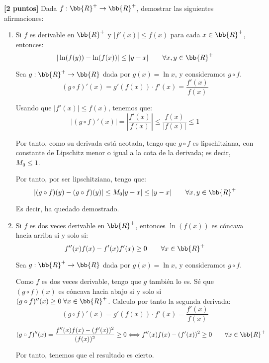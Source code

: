 \documentclass[12pt]{article}
\begin{document}
    \begin{ejercicio}\textbf{[2 puntos]}
Dada $f:\bb{R}^+ \to \bb{R}^+$, demostrar las siguientes afirmaciones:
\begin{enumerate}
    \item Si $f$ es derivable en $\bb{R}^+$ y $|f'(x)|\leq f(x)$ para cada $x\in \bb{R}^+$, entonces:
    \begin{equation*}
        |\ln (f(y)) -\ln(f(x))| \leq |y-x| \qquad \forall x,y\in \bb{R}^+
    \end{equation*}

    Sea $g:\bb{R}^+ \to \bb{R}$ dada por $g(x)=\ln x$, y consideramos $g\circ f$.
    \begin{equation*}
        (g\circ f)'(x) = g'(f(x))\cdot f'(x) = \frac{f'(x)}{f(x)} 
    \end{equation*}

    Usando que $|f'(x)|\leq f(x)$, tenemos que:
    \begin{equation*}
        \left|(g\circ f)'(x)\right| = \left|\frac{f'(x)}{f(x)}\right| \leq \frac{f(x)}{|f(x)|} \leq 1
    \end{equation*}

    Por tanto, como su derivada está acotada, tengo que $g\circ f$ es lipschitziana, con constante de Lipschitz menor o igual a la cota de la derivada; es decir, $M_0 \leq 1$.

    Por tanto, por ser lipschitziana, tengo que:
    \begin{equation*}
        |(g\circ f)(y)-(g\circ f)(y)| \leq M_0 |y-x| \leq  |y-x| \qquad \forall x,y\in \bb{R}^+
    \end{equation*}

    Es decir, ha quedado demostrado.

    \item Si $f$ es dos veces derivable en $\bb{R}^+$, entonces $\ln(f(x))$ es cóncava hacia arriba si y solo si:
    \begin{equation*}
        f''(x)f(x)-f'(x)f'(x)\geq 0 \qquad \forall x\in \bb{R}^+
    \end{equation*}

    Sea $g:\bb{R}^+ \to \bb{R}$ dada por $g(x)=\ln x$, y consideramos $g\circ f$.

    Como $f$ es dos veces derivable, tengo que $g$ también lo es. Sé que $(g\circ f)(x)$ es cóncava hacia abajo si y solo si $(g\circ f)''(x)\geq 0\;\forall x\in \bb{R}^+$. Calculo por tanto la segunda derivada:
    \begin{equation*}
        (g\circ f)'(x) = g'(f(x))\cdot f'(x) = \frac{f'(x)}{f(x)} 
    \end{equation*}
    \begin{equation*}
        (g\circ f)''(x) = \frac{f''(x)f(x)-(f'(x))^2}{(f(x))^2} \geq 0 \Longleftrightarrow
        f''(x)f(x)-(f'(x))^2 \geq 0 \qquad \forall x\in \bb{R}^+
    \end{equation*}

    Por tanto, tenemos que el resultado es cierto.
\end{enumerate}
    
\end{ejercicio}
\end{document}
